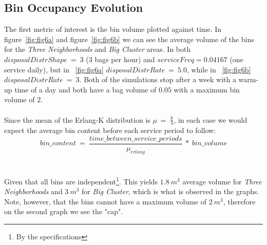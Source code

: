 \documentclass{article}
\begin{document}
		\subsection{Bin Occupancy Evolution}
		The first metric of interest is the bin volume plotted against time. In figure~\ref{fig:fig6a} and figure~\ref{fig:fig6b} we
		can see the average volume of the bins for the \textit{Three Neighborhoods} and \textit{Big Cluster} areas. In both
		$disposalDistrShape\ =\ 3$ (3 bags per hour) and $serviceFreq = 0.04167$ (one service daily), but in ~\ref{fig:fig6a}
		$disposalDistrRate\ = \ 5.0$, while in ~\ref{fig:fig6b} $disposalDistrRate\ =\ 3$. Both of the simulations stop after
		a week with a warm-up time of a day and both have a bag volume of $0.05$ with a maximum bin volume of $2$.
		\\
		\\
		Since the mean of the Erlang-K distribution is $\mu\ =\ \frac{k}{\lambda}$, in each case we would expect the average bin content
		before each service period to follow:
    	\begin{equation}
			bin\_content\ =\ \frac{time\_between\_service\_periods}{\mu_{erlang}}\ *\ bin\_volume
		\end{equation}
		\\
		\\
		Given that all bins are independent\footnote{By the specifications}. This yields $1.8\ m^3$ average volume for \textit{Three Neighborhoods}
		and $3\ m^3$ for \textit{Big Cluster}, which is what is observed in the graphs. Note, however, that the bins cannot have a maximum volume of
		$2\ m^3$, therefore on the second graph we see the "cap".
\end{document}
